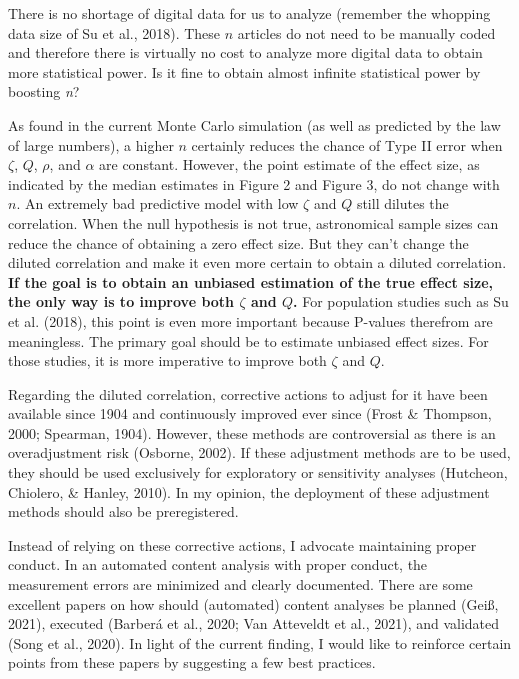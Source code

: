 \documentclass[english,man,floatsintext]{apa6}
\begin{document}
There is no shortage of digital data for us to analyze (remember the whopping data size of Su et al., 2018). These \(n\) articles do not need to be manually coded and therefore there is virtually no cost to analyze more digital data to obtain more statistical power. Is it fine to obtain almost infinite statistical power by boosting \emph{n}?

As found in the current Monte Carlo simulation (as well as predicted by the law of large numbers), a higher \(n\) certainly reduces the chance of Type II error when \(\zeta\), \(Q\), \(\rho\), and \(\alpha\) are constant. However, the point estimate of the effect size, as indicated by the median estimates in Figure 2 and Figure 3, do not change with \(n\). An extremely bad predictive model with low \(\zeta\) and \(Q\) still dilutes the correlation. When the null hypothesis is not true, astronomical sample sizes can reduce the chance of obtaining a zero effect size. But they can't change the diluted correlation and make it even more certain to obtain a diluted correlation. \textbf{If the goal is to obtain an unbiased estimation of the true effect size, the only way is to improve both \(\zeta\) and \(Q\).} For population studies such as Su et al. (2018), this point is even more important because P-values therefrom are meaningless. The primary goal should be to estimate unbiased effect sizes. For those studies, it is more imperative to improve both \(\zeta\) and \(Q\).

Regarding the diluted correlation, corrective actions to adjust for it have been available since 1904 and continuously improved ever since (Frost \& Thompson, 2000; Spearman, 1904). However, these methods are controversial as there is an overadjustment risk (Osborne, 2002). If these adjustment methods are to be used, they should be used exclusively for exploratory or sensitivity analyses (Hutcheon, Chiolero, \& Hanley, 2010). In my opinion, the deployment of these adjustment methods should also be preregistered.

Instead of relying on these corrective actions, I advocate maintaining proper conduct. In an automated content analysis with proper conduct, the measurement errors are minimized and clearly documented. There are some excellent papers on how should (automated) content analyses be planned (Geiß, 2021), executed (Barberá et al., 2020; Van Atteveldt et al., 2021), and validated (Song et al., 2020). In light of the current finding, I would like to reinforce certain points from these papers by suggesting a few best practices.
\end{document}
